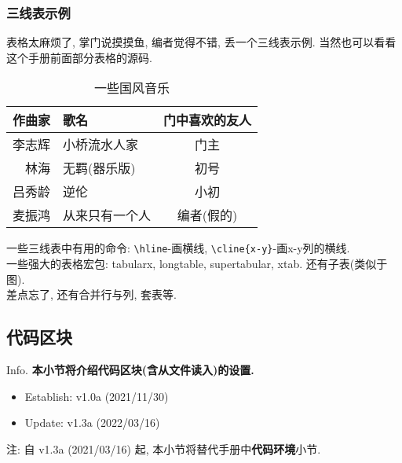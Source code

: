 \documentclass[hyperref, UTF8, CJK, aspectratio=169]{beamer}
\begin{document}
\cprotEnv\begin{frame}
	\frametitle{三线表示例}
	表格太麻烦了, 掌门说摸摸鱼, 编者觉得不错, 丢一个三线表示例. 当然也可以看看这个手册前面部分表格的源码.
	\begin{table}[htbp]
		\centering
		\caption{一些国风音乐}
		\label{tab:YixieGfyy}
		\begin{tabular}{rlc}
			\toprule
			作曲家 & 歌名 & 门中喜欢的友人 \\
			\midrule
			李志辉 & 小桥流水人家 & 门主 \\
			林海 & 无羁(器乐版) & 初号 \\
			吕秀龄 & 逆伦 & 小初 \\
			麦振鸿 & 从来只有一个人 & 编者(假的) \\
			\bottomrule
		\end{tabular}
	\end{table}
	一些三线表中有用的命令: \verb|\hline|-画横线, \verb|\cline|\verb!{x-y}!-画x-y列的横线.\\
	一些强大的表格宏包: tabularx, longtable, supertabular, xtab. 还有子表(类似于图).\\
	差点忘了, 还有合并行与列, 套表等.
\end{frame}

\subsection{代码区块}
\begin{frame}{Info.}
	\textbf{本小节将介绍代码区块(含从文件读入)的设置.}
	\begin{multicols}{2}
		\begin{itemize}
			\item Establish: \textcolor{univgreen}{v1.0a (2021/11/30)}
			\item Update: \textcolor{univgreen}{v1.3a (2022/03/16)}
		\end{itemize}
	\end{multicols}
	注: 自 \textcolor{univgreen}{v1.3a (2021/03/16)} 起, 本小节将替代手册中\alert{\textbf{代码环境}}小节.\par
	\mycopyright
\end{frame}
\end{document}
